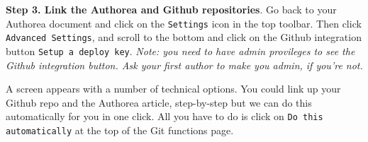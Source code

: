 \textbf{Step 3. Link the Authorea and Github repositories}. Go back to your Authorea document and click on the \verb|Settings| icon in the top toolbar. Then click \verb|Advanced Settings|, and scroll to the bottom and click on the Github integration button \verb|Setup a deploy key|. \textit{Note: you need to have admin provileges to see the Github integration button. Ask your first author to make you admin, if you're not.} 

A screen appears with a number of technical options. You could link up your Github repo and the Authorea article, step-by-step but we can do this automatically for you in one click. All you have to do is click on \verb|Do this automatically| at the top of the Git functions page. 